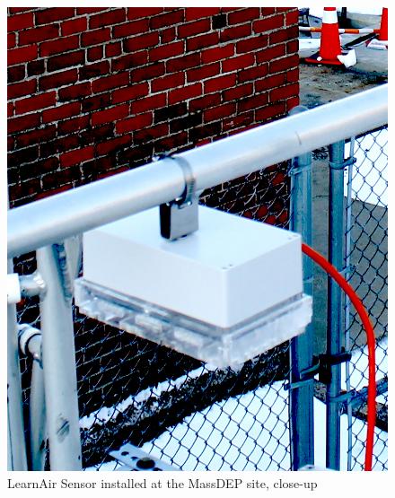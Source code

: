 \begin{figure}[htb]
 	\includegraphics[width=\textwidth]{visuals/learnairV1_installed_zoomed}               
 	 \caption{LearnAir Sensor installed at the MassDEP site, close-up}
  	\label{fig:learnair_installed_zoomed}
\end{figure}


